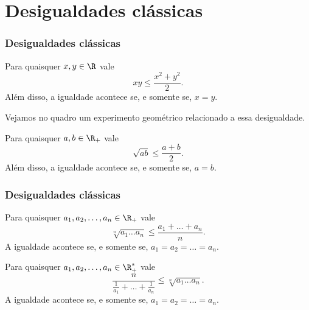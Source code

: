 
\section{Desigualdades clássicas}
\begin{frame}
    \frametitle{Desigualdades clássicas} 
    
    \begin{teorema}
    Para quaisquer $x, y \in \R$ vale
    \begin{equation*}
            xy \leq \frac {x^2 +y^2} 2.
    \end{equation*}
    Além disso, a igualdade acontece se, e somente se, $x=y$.
    \end{teorema}\pause
    
    Vejamos no quadro um experimento geométrico relacionado a essa
    desigualdade.\pause

    \begin{teorema}
        Para quaisquer $a, b \in \R_+$ vale
        \begin{equation*}
                \sqrt{ab} \leq \frac {a +b} 2.
        \end{equation*}
        Além disso, a igualdade acontece se, e somente se, $a=b$.
        \end{teorema}
    \end{frame}
    \begin{frame}
    \frametitle{Desigualdades clássicas} 
       
    \begin{teorema}
    Para quaisquer $a_1, a_2, \dots , a_n \in \R_+$ vale
    \begin{equation*}
            \sqrt[n]{a_1\dots a_n} \leq \frac {a_1 + \dots + a_n} n.
    \end{equation*}
    A igualdade acontece se, e somente se, $a_1 = a_2 = \dots = a_n$.
    \end{teorema}\pause

    \begin{teorema}
        Para quaisquer $a_1, a_2, \dots , a_n \in \R_+^*$ vale
        \begin{equation*}
                \frac n {\frac 1 {a_1} + \dots + \frac 1 {a_n}}  \leq \sqrt[n]{a_1\dots a_n}  .
        \end{equation*}
        A igualdade acontece se, e somente se, $a_1 = a_2 = \dots = a_n$.
        \end{teorema}
    
    \end{frame}
